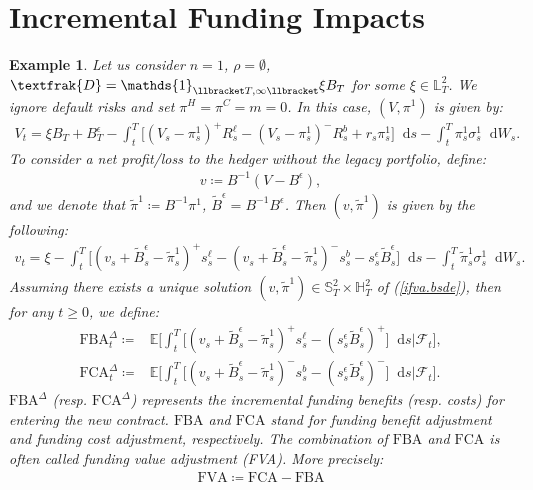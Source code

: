 \documentclass[a4paper, 11pt]{article}              %
\numberwithin{equation}{section}
\theoremstyle{plain}
\newcommand{\FBA}{\text{FBA}}
\newcommand{\FCA}{\text{FCA}}
\newcommand{\FVA}{\text{FVA}}
\newcommand{\1}{\mathds{1}}
\newcommand{\calF}{\mathcal{F}}
\newcommand{\frD}{\textfrak{D}}
\newcommand{\Bt}{\tilde{B}}
\newcommand{\pit}{\tilde{\pi}}
\newcommand{\dsE}{\mathbb{E}}
\newcommand{\dsH}{\mathbb{H}}
\newcommand{\dsL}{\mathbb{L}}
\newcommand{\dsS}{\mathbb{S}}
\theoremstyle{plain}
\theoremstyle{definition}
\newtheorem{example}[thm]{Example}
\theoremstyle{plain}
\newtheorem{example}{Example}
\newcommand*\df{\mathop{}\!\mathrm{d}}
\begin{document}
\section{Incremental Funding Impacts}
\label{sec:inc}
\begin{example} 
Let us consider $n=1$, $\rho =\emptyset$,
$\frD = \1_{\llbracket T, \infty \llbracket} \xi B_T$ for some
$\xi \in \dsL^2_T$. We ignore default risks and set $\pi^H = \pi^C = m=0$. In this
case, $(V, \pi^1)$ is given by:
\begin{align}
  V_t = \xi B_T +B_T^\epsilon - \int_{t}^{T}\Big[(V_s - \pi^1_s)^+R^\ell_s
  -(V_s - \pi^1_s)^-R^b_s + r_s \pi^1_s\Big]\df s  -\int_{t}^{T} \pi^1_s \sigma^1_s \df W_s. \nonumber
\end{align}
To consider a net profit/loss to the hedger without the \textit{legacy portfolio}, define:
 \begin{align}
   v\coloneqq B^{-1}(V -B^\epsilon), \label{ex.net}
 \end{align}
 and we denote that $\pit^1 \coloneqq B^{-1}\pi^1$,
 $\Bt^\epsilon = B^{-1}B^\epsilon$. Then $(v, \pit^1)$ is given by the following:
\begin{align}
  v_t = \xi - \int_{t}^{T}\Big[(v_s +\Bt^\epsilon_s- \pit^1_s)^+s^\ell_s
  -(v_s +\Bt^\epsilon_s - \pit^1_s)^-s^b_s -s^\epsilon_s\Bt^\epsilon_s\Big]\df s  -\int_{t}^{T} \pit^1_s
  \sigma^1_s \df W_s. \label{ifva.bsde}
\end{align}
Assuming there exists a unique solution $(v, \pit^1) \in \dsS^2_T \times \dsH^2_T$ of
(\ref{ifva.bsde}), then for any $t \geq0$, we define:
\begin{align}
\FBA^ \Delta_t \coloneqq &\dsE\bigg[
\int_{t}^{T}\big[(v_s +\Bt^\epsilon_s- \pit^1_s)^+s^\ell_s-(s^\epsilon_s\Bt^\epsilon_s)^+\big]\df s\bigg\vert \calF_t\bigg], \label{ex.fba.d}\\
 \text{FCA}^\Delta_t \coloneqq &\dsE\bigg[
\int_{t}^{T}\big[ (v_s +\Bt^\epsilon_s- \pit^1_s)^-s^b_s-(s^\epsilon_s\Bt^\epsilon_s)^- \big] \df s\bigg\vert \calF_t\bigg].  \label{ex.fca.d} 
\end{align}
$\text{FBA}^\Delta$ (resp. $ \text{FCA}^\Delta$) represents the incremental funding
benefits (resp. costs) for entering the new contract. $\FBA$ and $\FCA$ stand
for \textit{funding benefit adjustment} and \textit{funding cost adjustment},
respectively. The combination of $\FBA$ and $\FCA$ is often called
\textit{funding value adjustment} (FVA). More precisely:
\begin{align}
  \FVA \coloneqq \FCA - \FBA \nonumber
\end{align}


\end{example}
\end{document}
